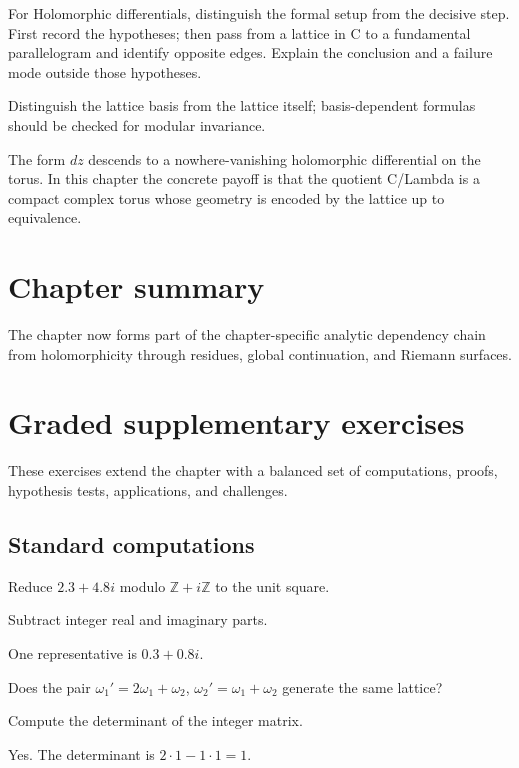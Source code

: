\begin{exercise}\label{exr:iv27-08}
For Holomorphic differentials, distinguish the formal setup from the decisive step. First record the hypotheses; then pass from a lattice in C to a fundamental parallelogram and identify opposite edges. Explain the conclusion and a failure mode outside those hypotheses.
\end{exercise}
\begin{hint}
Distinguish the lattice basis from the lattice itself; basis-dependent formulas should be checked for modular invariance.
\end{hint}
\begin{solution}
The form $dz$ descends to a nowhere-vanishing holomorphic differential on the torus. In this chapter the concrete payoff is that the quotient C/Lambda is a compact complex torus whose geometry is encoded by the lattice up to equivalence.
\end{solution}

\section*{Chapter summary}
The chapter now forms part of the chapter-specific analytic dependency chain from holomorphicity through residues, global continuation, and Riemann surfaces.
\section{Graded supplementary exercises}
These exercises extend the chapter with a balanced set of computations, proofs, hypothesis tests, applications, and challenges.

\subsection*{Standard computations}

\begin{exercise}\label{exr:iv27-expand-01}
Reduce \(2.3+4.8i\) modulo \(\mathbb Z+i\mathbb Z\) to the unit square.
\end{exercise}
\begin{hint}
Subtract integer real and imaginary parts.
\end{hint}
\begin{solution}
One representative is \(0.3+0.8i\).
\end{solution}

\begin{exercise}\label{exr:iv27-expand-02}
Does the pair \(\omega_1'=2\omega_1+\omega_2\), \(\omega_2'=\omega_1+\omega_2\) generate the same lattice?
\end{exercise}
\begin{hint}
Compute the determinant of the integer matrix.
\end{hint}
\begin{solution}
Yes. The determinant is \(2\cdot1-1\cdot1=1\).
\end{solution}

